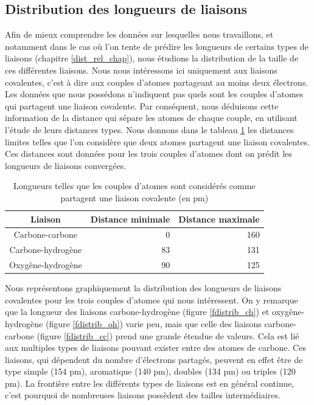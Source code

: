 \subsection{Distribution des longueurs de liaisons}

\label{donnees_distrib_longueurs_liaisons}


\par Afin de mieux comprendre les données sur lesquelles nous travaillons, et notamment dans le cas où l'on tente de prédire les longueurs de certains types de liaisons (chapitre \ref{dist_rel_chap}), nous étudions la distribution de la taille de ces différentes liaisons. Nous nous intéressons ici uniquement aux liaisons covalentes, c'est à dire aux couples d'atomes partageant au moins deux électrons. Les données que nous possédons n'indiquent pas quels sont les couples d'atomes qui partagent une liaison covalente. Par conséquent, nous déduisons cette information de la distance qui sépare les atomes de chaque couple, en utilisant l'étude de leurs distances types. Nous donnons dans le tableau \ref{table_dist_liaisons} les distances limites telles que l'on considère que deux atomes partagent une liaison covalentes. Ces distances sont données pour les trois couples d'atomes dont on prédit les longueurs de liaisons convergées.

\begin{table}
	\centering
	\begin{tabular}{|c|r|r|}
		\hline
		\textbf{Liaison} & \textbf{Distance minimale} & \textbf{Distance maximale} \\ \hline
		Carbone-carbone & 0 & 160 \\ \hline
		Carbone-hydrogène & 83 & 131 \\ \hline
		Oxygène-hydrogène & 90 & 125 \\ \hline
	\end{tabular}
	
	\caption{Longueurs telles que les couples d'atomes sont considérés comme partagent une liaison covalente (en pm)}
	\label{table_dist_liaisons}
\end{table}

\par Nous représentons graphiquement la distribution des longueurs de liaisons covalentes pour les trois couples d'atomes qui nous intéressent. On y remarque que la longueur des liaisons carbone-hydrogène (figure \ref{fdistrib_ch}) et oxygène-hydrogène (figure \ref{fdistrib_oh}) varie peu, mais que celle des liaisons carbone-carbone (figure \ref{fdistrib_cc}) prend une grande étendue de valeurs. Cela est lié aux multiples types de liaisons pouvant exister entre des atomes de carbone. Ces liaisons, qui dépendent du nombre d'électrons partagés, peuvent en effet être de type simple (154 pm), aromatique (140 pm), doubles (134 pm) ou triples (120 pm). La frontière entre les différents types de liaisons est en général continue, c'est pourquoi de nombreuses liaisons possèdent des tailles intermédiaires.

